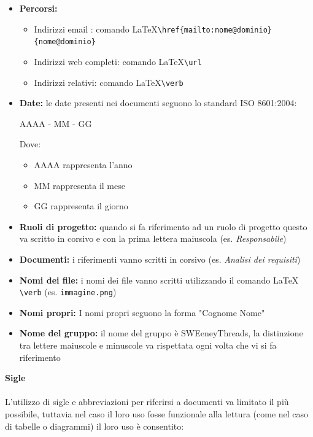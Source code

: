 \documentclass[a4paper]{report}
\begin{document}
	\begin{itemize}
		\item \textbf{Percorsi:} 
		\begin{itemize}
			\item Indirizzi email : comando \LaTeX \space \verb|\href{mailto:nome@dominio}{nome@dominio}|
			\item Indirizzi web completi: comando \LaTeX \space \verb|\url|
			\item Indirizzi relativi: comando \LaTeX  \space \verb|\verb|
		\end{itemize}
		\item \textbf{Date:} le date presenti nei documenti seguono lo standard ISO 8601:2004:
		\begin{center}
			AAAA - MM - GG
		\end{center}
		Dove:
		\begin{itemize}
			\item AAAA rappresenta l'anno 
			\item MM rappresenta il mese
			\item GG rappresenta il giorno
		\end{itemize}
		\item \textbf{Ruoli di progetto:} quando si fa riferimento ad un ruolo di progetto questo va scritto in corsivo
		e con la prima lettera maiuscola (es. \textit{Responsabile})
		\item \textbf{Documenti:} i riferimenti vanno scritti in corsivo (es. \textit{Analisi dei requisiti})
		\item \textbf{Nomi dei file:} i nomi dei file vanno scritti utilizzando il comando \LaTeX \space 
		\verb|\verb| (es. \verb|immagine.png|)
		\item \textbf{Nomi propri:} I nomi propri seguono la forma "Cognome Nome"
		\item \textbf{Nome del gruppo:} il nome del gruppo è SWEeneyThreads, la distinzione tra lettere maiuscole e
		minuscole va rispettata ogni volta che vi si fa riferimento
	\end{itemize}
	\textbf{Sigle} \\ \\
	L'utilizzo di sigle e abbreviazioni per riferirsi a documenti va limitato il più possibile, tuttavia nel caso il loro uso
	fosse funzionale alla lettura (come nel caso di tabelle o diagrammi) il loro uso è consentito:
\end{document}
